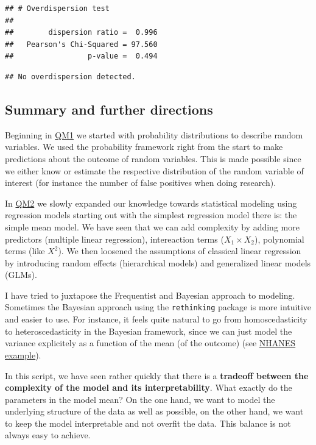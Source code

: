 \documentclass[
]{article}
\begin{document}
\begin{verbatim}
## # Overdispersion test
## 
##        dispersion ratio =  0.996
##   Pearson's Chi-Squared = 97.560
##                 p-value =  0.494
\end{verbatim}

\begin{verbatim}
## No overdispersion detected.
\end{verbatim}

\subsection{Summary and further
directions}\label{summary-and-further-directions}

Beginning in
\href{https://jdegenfellner.github.io/Script_QM1_ZHAW/}{QM1} we started
with probability distributions to describe random variables. We used the
probability framework right from the start to make predictions about the
outcome of random variables. This is made possible since we either know
or estimate the respective distribution of the random variable of
interest (for instance the number of false positives when doing
research).

In
\href{https://jdegenfellner.github.io/Script_QM2_ZHAW/index.html}{QM2}
we slowly expanded our knowledge towards statistical modeling using
regression models starting out with the simplest regression model there
is: the simple mean model. We have seen that we can add complexity by
adding more predictors (multiple linear regression), intereaction terms
(\(X_1 \times X_2\)), polynomial terms (like \(X^2\)). We then loosened
the assumptions of classical linear regression by introducing random
effects (hierarchical models) and generalized linear models (GLMs).

I have tried to juxtapose the Frequentist and Bayesian approach to
modeling. Sometimes the Bayesian approach using the \texttt{rethinking}
package is more intuitive and easier to use. For instance, it feels
quite natural to go from homoscedasticity to heteroscedasticity in the
Bayesian framework, since we can just model the variance explicitely as
a function of the mean (of the outcome) (see
\href{https://jdegenfellner.github.io/Script_QM2_ZHAW/multiple-linear-regression.html\#example_nhanes}{NHANES
example}).

In this script, we have seen rather quickly that there is a
\textbf{tradeoff between the complexity of the model and its
interpretability}. What exactly do the parameters in the model mean? On
the one hand, we want to model the underlying structure of the data as
well as possible, on the other hand, we want to keep the model
interpretable and not overfit the data. This balance is not always easy
to achieve.
\end{document}
